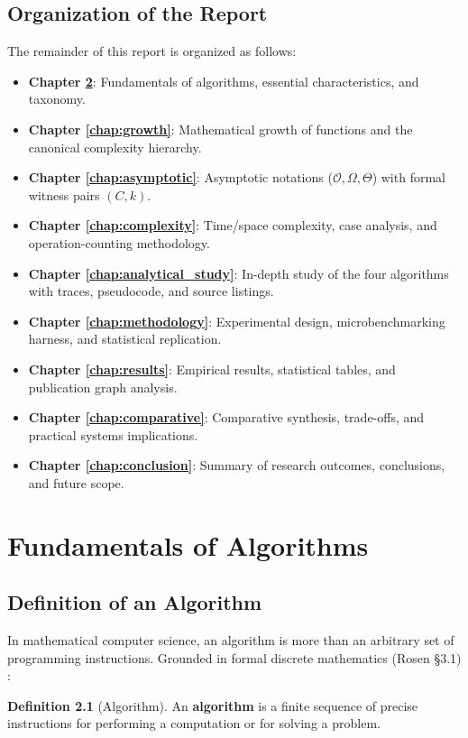 \documentclass[11pt,a4paper,oneside]{report}
\theoremstyle{definition}
\newtheorem{definition}{Definition}[chapter]
\begin{document}
\section{Organization of the Report}
The remainder of this report is organized as follows:
\begin{itemize}
    \item \textbf{Chapter \ref{chap:fundamentals}}: Fundamentals of algorithms, essential characteristics, and taxonomy.
    \item \textbf{Chapter \ref{chap:growth}}: Mathematical growth of functions and the canonical complexity hierarchy.
    \item \textbf{Chapter \ref{chap:asymptotic}}: Asymptotic notations ($\mathcal{O}, \Omega, \Theta$) with formal witness pairs $(C, k)$.
    \item \textbf{Chapter \ref{chap:complexity}}: Time/space complexity, case analysis, and operation-counting methodology.
    \item \textbf{Chapter \ref{chap:analytical_study}}: In-depth study of the four algorithms with traces, pseudocode, and source listings.
    \item \textbf{Chapter \ref{chap:methodology}}: Experimental design, microbenchmarking harness, and statistical replication.
    \item \textbf{Chapter \ref{chap:results}}: Empirical results, statistical tables, and publication graph analysis.
    \item \textbf{Chapter \ref{chap:comparative}}: Comparative synthesis, trade-offs, and practical systems implications.
    \item \textbf{Chapter \ref{chap:conclusion}}: Summary of research outcomes, conclusions, and future scope.
\end{itemize}

\chapter{Fundamentals of Algorithms}
\label{chap:fundamentals}

\section{Definition of an Algorithm}
In mathematical computer science, an algorithm is more than an arbitrary set of programming instructions. Grounded in formal discrete mathematics (Rosen §3.1) \cite{rosen2019discrete}:

\begin{definition}[Algorithm]
An \textbf{algorithm} is a finite sequence of precise instructions for performing a computation or for solving a problem.
\end{definition}
\end{document}
